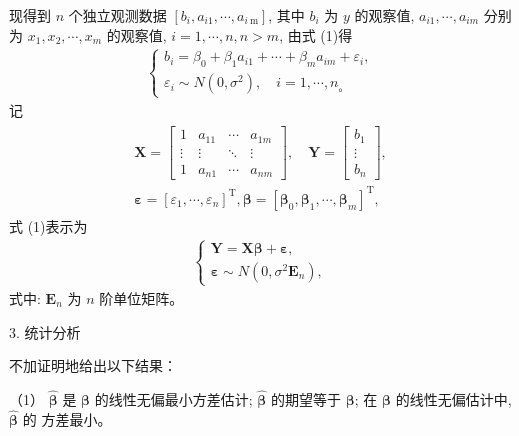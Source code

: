 现得到 $n$ 个独立观测数据 $\left[b_i, a_{i 1}, \cdots, a_{i \mathrm{~m}}\right]$, 其中 $b_i$ 为 $y$ 的观察值, $a_{i 1}, \cdots, a_{i m}$ 分别为 $x_1, x_2, \cdots, x_m$ 的观察值, $i=1, \cdots, n, n>m$, 由式 (1)得
\begin{align}
	\left\{\begin{array}{l}
		b_i=\beta_0+\beta_1 a_{i 1}+\cdots+\beta_m a_{i m}+\varepsilon_i, \\
		\varepsilon_i \sim N\left(0, \sigma^2\right), \quad i=1, \cdots, n_{\text {。 }}
	\end{array}\right.
\end{align}
记
\begin{align}
	\begin{gathered}
		\boldsymbol{X}=\left[\begin{array}{cccc}
			1 & a_{11} & \cdots & a_{1 m} \\
			\vdots & \vdots & \ddots & \vdots \\
			1 & a_{n 1} & \cdots & a_{n m}
		\end{array}\right], \quad \boldsymbol{Y}=\left[\begin{array}{c}
			b_1 \\
			\vdots \\
			b_n
		\end{array}\right], \\
		\boldsymbol{\varepsilon}=\left[\varepsilon_1, \cdots, \varepsilon_n\right]^{\mathrm{T}}, \boldsymbol{\beta}=\left[\boldsymbol{\beta}_0, \boldsymbol{\beta}_1, \cdots, \boldsymbol{\beta}_m\right]^{\mathrm{T}},
	\end{gathered}
\end{align}
式 (1)表示为
\begin{align}
	\left\{\begin{array}{l}
		\boldsymbol{Y}=\boldsymbol{X} \boldsymbol{\beta}+\boldsymbol{\varepsilon}, \\
		\boldsymbol{\varepsilon} \sim N\left(0, \sigma^2 \boldsymbol{E}_n\right),
	\end{array}\right.
\end{align}
式中: $\boldsymbol{E}_n$ 为 $n$ 阶单位矩阵。

3. 统计分析

不加证明地给出以下结果：

（1） $\hat{\boldsymbol{\beta}}$ 是 $\boldsymbol{\beta}$ 的线性无偏最小方差估计; $\hat{\boldsymbol{\beta}}$ 的期望等于 $\boldsymbol{\beta}$; 在 $\boldsymbol{\beta}$ 的线性无偏估计中, $\hat{\boldsymbol{\beta}}$ 的 方差最小。

